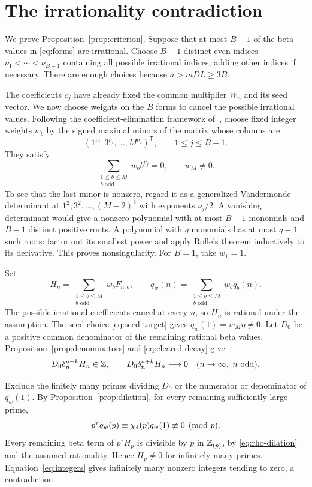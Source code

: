 \section{The irrationality contradiction}\label{sec:contradiction}

We prove Proposition~\ref{prop:criterion}. Suppose that at most
$B-1$ of the beta values in \eqref{eq:forms} are irrational.
Choose $B-1$ distinct even indices
$\nu_1<\cdots<\nu_{B-1}$ containing all possible irrational
indices, adding other indices if necessary. There are enough
choices because $a>mDL\ge3B$.

The coefficients $c_j$ have already fixed the common multiplier
$W_n$ and its seed vector. We now choose weights on the $B$
forms to cancel the possible irrational values.
Following the coefficient-elimination framework
of~\cite[Section~5]{LY20}, choose fixed integer weights $w_b$
by the signed maximal minors of the matrix whose columns are
\[
 (1^{\nu_j},3^{\nu_j},\ldots,M^{\nu_j})^{\mathsf T},
 \qquad 1\le j\le B-1.
\]
They satisfy
\[
 \sum_{\substack{1\le b\le M\\b\text{ odd}}}w_b b^{\nu_j}=0,
 \qquad w_M\ne0.
\]
To see that the last minor is nonzero, regard it as a generalized
Vandermonde determinant at
$1^2,3^2,\ldots,(M-2)^2$ with exponents $\nu_j/2$.
A vanishing determinant would give a nonzero polynomial with
at most $B-1$ monomials and $B-1$ distinct positive roots.
A polynomial with $q$ monomials has at most $q-1$ such roots:
factor out its smallest power and apply Rolle's theorem
inductively to its derivative. This proves nonsingularity.
For $B=1$, take $w_1=1$.

Set
\[
 H_n=\sum_{\substack{1\le b\le M\\b\text{ odd}}}w_bF_{n,b},
 \qquad
 q_w(n)=\sum_{\substack{1\le b\le M\\b\text{ odd}}}w_bq_b(n).
\]
The possible irrational coefficients cancel at every $n$, so
$H_n$ is rational under the assumption. The seed choice
\eqref{eq:seed-target} gives $q_w(1)=w_M\eta\ne0$.
Let $D_0$ be a positive common denominator of the remaining
rational beta values. Proposition~\ref{prop:denominators} and
\eqref{eq:cleared-decay} give
\begin{equation}\label{eq:integers}
 D_0\delta_n^{a+k}H_n\in\mathbb Z,\qquad
 D_0\delta_n^{a+k}H_n\longrightarrow0
                 \quad(n\to\infty,\ n\text{ odd}).
\end{equation}

Exclude the finitely many primes dividing $D_0$ or the numerator
or denominator of $q_w(1)$. By Proposition~\ref{prop:dilation},
for every remaining sufficiently large prime,
\[
 p^\tau q_w(p)\equiv\chi_4(p)q_w(1)\not\equiv0\pmod p.
\]
Every remaining beta term of $p^\tau H_p$ is divisible by $p$
in $\mathbb Z_{(p)}$, by \eqref{eq:rho-dilation} and the assumed rationality.
Hence $H_p\ne0$ for infinitely many primes.
Equation~\eqref{eq:integers} gives infinitely many nonzero
integers tending to zero, a contradiction.
